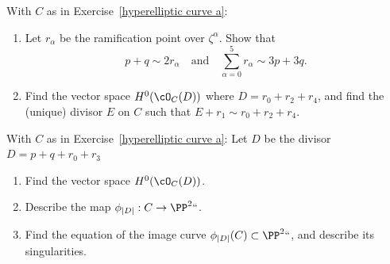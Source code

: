\begin{exercise} With $C$ as in Exercise~\ref{hyperelliptic curve a}:
\begin{enumerate}

\item Let $r_\alpha$ be the ramification point over $\zeta^\alpha$. Show that
$$
p+q \sim 2r_\alpha \quad \text{and} \quad \sum_{\alpha = 0}^5 r_\alpha \sim 3p+3q.
$$

\item Find the vector space $H^0(\cO_C(D))$ where $D = r_0 + r_2 + r_4$, and find the (unique) divisor $E$ on $C$ such that $E + r_1 \sim r_0 + r_2 + r_4$.

\end{enumerate}

\end{exercise}

\begin{exercise}
With $C$ as in Exercise~\ref{hyperelliptic curve a}:
Let $D$ be the divisor $D = p + q + r_0 + r_3$
\begin{enumerate}
\item Find the vector space $H^0(\cO_C(D))$.
\item Describe the map $\phi_{|D|} : C \to \PP^2` `$.
\item Find the equation of the image curve $\phi_{|D|}(C) \subset \PP^2` `$, and describe its singularities.
\end{enumerate}
\end{exercise}
 
